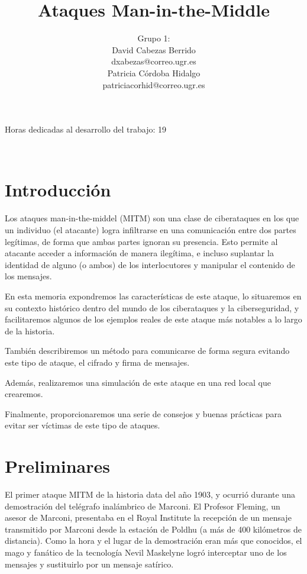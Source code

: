 \documentclass[11pt]{article}
\title{\Huge Ataques Man-in-the-Middle \vspace{10mm}}
\author{\Large Grupo 1: \vspace{10mm} \\
	\Large David Cabezas Berrido \vspace{5mm} \\ 
  \Large dxabezas@correo.ugr.es \vspace{10mm} \\
  \Large Patricia Córdoba Hidalgo \vspace{5mm} \\ 
	\Large patriciacorhid@correo.ugr.es \vspace{10mm}}
\begin{document}
\maketitle
\vfill
\begin{flushleft}
{\Large Horas dedicadas al desarrollo del trabajo: 19}
\end{flushleft}
\vspace{40mm}
~
\newpage
\tableofcontents
\newpage

\section{Introducción}

Los ataques man-in-the-middel (MITM) son una clase de ciberataques en los que un individuo (el atacante) logra infiltrarse en una
comunicación entre dos partes legítimas, de forma que ambas partes ignoran su presencia. Esto permite al atacante acceder a información
de manera ilegítima, e incluso suplantar la identidad de alguno (o ambos) de los interlocutores y manipular el contenido de los mensajes.

En esta memoria expondremos las características de este ataque, lo situaremos en su contexto histórico dentro del mundo de los ciberataques y la
 ciberseguridad, y facilitaremos algunos de los ejemplos reales de este ataque más notables a lo largo de la historia.
 
 También describiremos un método para comunicarse de forma segura evitando este tipo de ataque, el cifrado y firma de mensajes.
 
Además, realizaremos una simulación de este ataque en una red local que crearemos.

Finalmente, proporcionaremos una serie de consejos y buenas prácticas para evitar ser víctimas de este tipo de ataques.

\section{Preliminares}

El primer ataque MITM de la historia data del año 1903, y ocurrió durante una demostración del telégrafo inalámbrico de Marconi.
El Profesor Fleming, un asesor de Marconi, presentaba en el Royal Institute la recepción de un mensaje transmitido por Marconi desde la estación de
 Poldhu (a más de 400 kilómetros de distancia). Como la hora y el lugar de la demostración eran más que conocidos, el mago y fanático de la
tecnología Nevil Maskelyne logró interceptar uno de los mensajes y sustituirlo por un mensaje satírico.
\end{document}
